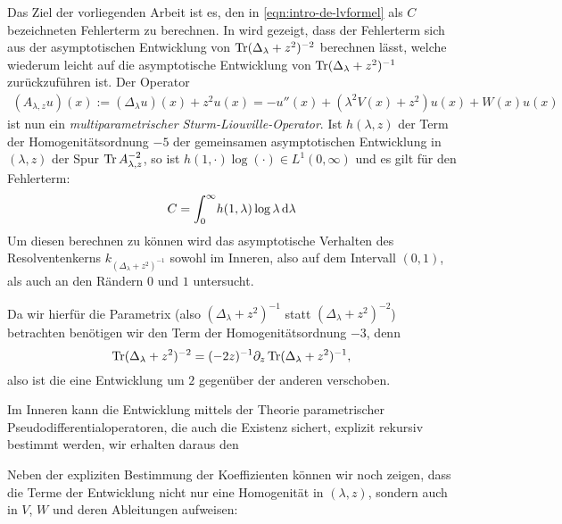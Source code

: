 Das Ziel der vorliegenden Arbeit ist es, den in \cref{eqn:intro-de-lvformel} als
$C$ bezeichneten Fehlerterm zu berechnen. In \cite{LV13} wird gezeigt, dass der
Fehlerterm sich aus der asymptotischen Entwicklung von $\Tr(\Delta_\lambda +
z^2)^{-2}$ berechnen lässt, welche wiederum leicht auf die asymptotische
Entwicklung von $\Tr(\Delta_\lambda + z^2)^{-1}$ zurückzuführen ist. Der
Operator
\begin{align*}
  (A_{\lambda,z}u)(x) := (\Delta_\lambda u)(x) + z^2 u(x)
           = -u''(x) + (\lambda^2 V(x) + z^2) u(x) + W(x) u(x)
\end{align*}
ist nun ein \emph{multiparametrischer Sturm-Liouville-Operator}. Ist $h(\lambda,
z)$ der Term der Homogenitätsordnung $-5$ der gemeinsamen asymptotischen
Entwicklung in $(\lambda,z)$ der Spur $\Tr A_{\lambda,z}^{-2}$, so ist
$h(1,\cdot)\log(\cdot)\in L^1(0,\infty)$ und es gilt für den Fehlerterm:
\begin{align*}
  C = \Integ[\infty]{0}{\lambda}{h(1,\lambda)\log\lambda}
\end{align*}
Um diesen berechnen zu können wird das asymptotische Verhalten des
Resolventenkerns $k_{(\Delta_\lambda + z^2)^{-1}}$ sowohl im Inneren, also auf dem
Intervall $(0,1)$, als auch an den Rändern $0$ und $1$ untersucht.

Da wir hierfür die Parametrix (also $(\Delta_\lambda + z^2)^{-1}$ statt
$(\Delta_\lambda + z^2)^{-2}$) betrachten benötigen wir den Term der
Homogenitätsordnung $-3$, denn
\begin{equation*}
  \Tr(\Delta_\lambda + z^2)^{-2} = (-2z)^{-1}\partial_z\Tr(\Delta_\lambda +
  z^2)^{-1},
\end{equation*}
also ist die eine Entwicklung um $2$ gegenüber der anderen verschoben.

Im Inneren kann die Entwicklung mittels der Theorie parametrischer
Pseudodifferentialoperatoren, die auch die Existenz sichert, explizit rekursiv
bestimmt werden, wir erhalten daraus den 
\begin{Hauptsatz}
  
\end{Hauptsatz}
Neben der expliziten Bestimmung der Koeffizienten können wir noch zeigen, dass
die Terme der Entwicklung nicht nur eine Homogenität in $(\lambda,z)$, sondern
auch in $V$, $W$ und deren Ableitungen aufweisen:
\begin{Hauptsatz}
  
\end{Hauptsatz}

